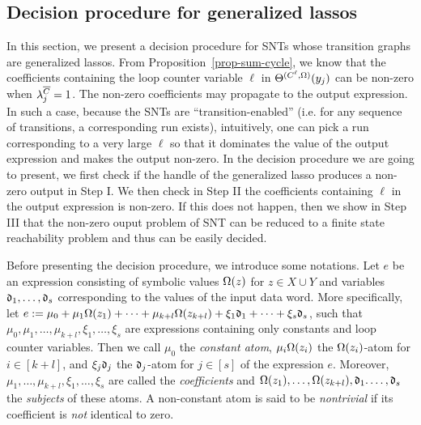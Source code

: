\vspace{-0.5cm}
\subsection{Decision procedure for generalized lassos}\label{sec-glasso}
\vspace{-1mm}
%
In this section, we present a decision procedure for SNTs whose transition graphs are generalized lassos. From Proposition~\ref{prop-sum-cycle}, we know that the coefficients containing the loop counter variable $\ell$ in $\Theta^{(C^\ell,\Omega)}(y_j)$ can be non-zero when $\lambda^{\overline{C}}_{j}=1$. The non-zero coefficients may propagate to the output expression.  In such a case, 
because the SNTs are ``transition-enabled'' (i.e. for any sequence of transitions, a corresponding run exists), %
intuitively, one can pick a run corresponding to a very large $\ell$ so that it dominates the value of the output expression and makes the output non-zero. 
In the decision procedure we are going to present, we first check if the handle of the generalized lasso produces a non-zero output in Step I.
We then check in Step II the coefficients containing $\ell$ in the output expression is non-zero. If this does not happen, then we show in Step III that the non-zero ouput problem of SNT can be reduced to a finite state reachability problem and thus can be easily decided.

Before presenting the decision procedure, we introduce some notations.
Let $e$ be an expression consisting of symbolic values $\Omega(z)$ for $z\in X\cup Y$ and variables $\mathfrak{d}_1, \dots, \mathfrak{d}_{s}$ corresponding to the values of the input data word. More specifically, let $e:=\mu_0 + \mu_1 \Omega(z_1) +\dots + \mu_{k+l} \Omega(z_{k+l}) + \xi_1 \mathfrak{d}_1 + \dots + \xi_{s} \mathfrak{d}_{s}$,
such that $\mu_0,\mu_1,\dots,\mu_{k+l}, \xi_1,\dots,\xi_{s}$ are expressions containing only constants and loop counter variables.
Then we call $\mu_0$ the \emph{constant atom}, $\mu_i \Omega(z_i)$ the $\Omega(z_i)$-atom for $i\in[k+l]$, and $\xi_j \mathfrak{d}_j$ the $\mathfrak{d}_j$-atom for $j\in[s]$ of the expression $e$. Moreover, $\mu_1, \dots, \mu_{k+l}, \xi_1,\dots, \xi_{s}$ are called the \emph{coefficients} and $\Omega(z_1), \dots, \Omega(z_{k+l}), \mathfrak{d}_1. \dots, \mathfrak{d}_{s}$ the \emph{subjects} of these atoms.
A non-constant atom is said to be \emph{nontrivial} if its coefficient is \emph{not} identical to zero.

